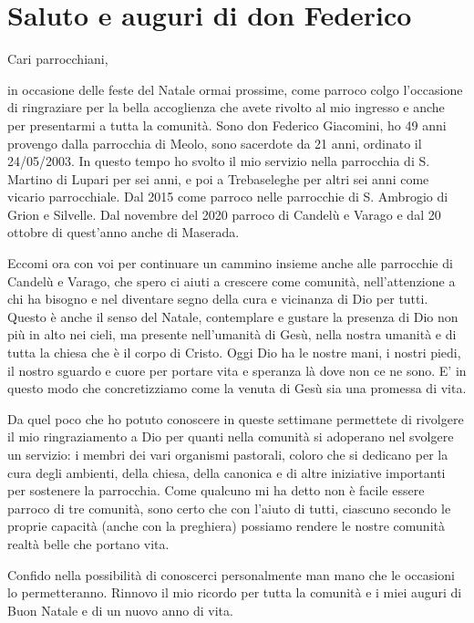 \section{Saluto e auguri di don Federico}

Cari parrocchiani,

in occasione delle feste del Natale ormai prossime, come parroco colgo l’occasione di ringraziare per la bella accoglienza che avete rivolto al mio ingresso e anche per presentarmi  a tutta la comunità. Sono don Federico Giacomini, ho 49 anni provengo dalla parrocchia di Meolo, sono sacerdote da 21 anni, ordinato il 24/05/2003. In questo tempo ho svolto il mio servizio nella parrocchia di S. Martino di Lupari per sei anni, e poi a Trebaseleghe per altri sei anni come vicario parrocchiale. Dal 2015 come parroco nelle parrocchie di S. Ambrogio di Grion e Silvelle. Dal novembre del 2020 parroco di Candelù e Varago e dal 20 ottobre di quest’anno anche di Maserada.

Eccomi ora con voi per continuare un cammino insieme anche alle parrocchie di Candelù e Varago, che spero ci aiuti a crescere come comunità, nell’attenzione a chi ha bisogno e nel diventare segno della cura e vicinanza di Dio per tutti. Questo è anche il senso del Natale, contemplare e gustare la presenza di Dio non più in alto nei cieli, ma presente nell’umanità di Gesù, nella nostra umanità e di tutta la chiesa che è il corpo di Cristo. Oggi Dio ha le nostre mani, i nostri piedi, il nostro sguardo e cuore per portare vita e speranza là dove non ce ne sono. E’ in questo modo che concretizziamo come la venuta di Gesù sia una promessa di vita.

Da quel poco che ho potuto conoscere in queste settimane permettete di rivolgere il mio ringraziamento a Dio per quanti nella comunità si adoperano nel svolgere un servizio: i membri dei vari organismi pastorali, coloro che si dedicano per la cura degli ambienti, della chiesa, della canonica e di altre iniziative importanti per sostenere la parrocchia. Come qualcuno mi ha detto non è facile essere parroco di tre comunità, sono certo che con l’aiuto di tutti, ciascuno secondo le proprie capacità (anche con la preghiera) possiamo rendere le nostre comunità realtà belle che portano vita.

Confido nella possibilità di conoscerci personalmente man mano che le occasioni lo permetteranno. Rinnovo il mio ricordo per tutta la comunità e i miei auguri di Buon Natale e di un nuovo anno di vita.

